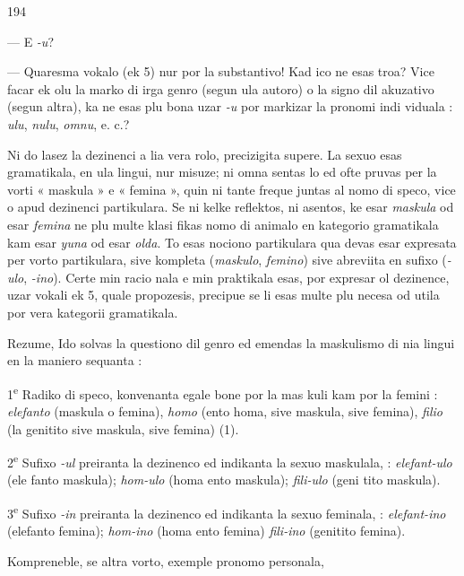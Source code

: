 \begin{VUpage}[198]{194}

--- E \textit{-u}?

--- Quaresma vokalo (ek 5) nur por la substantivo! Kad\nl
ico ne esas troa? Vice facar ek olu la marko di irga genro\nl
(segun ula autoro) o la signo dil akuzativo (segun altra),\nl
ka ne esas plu bona uzar \textit{-u} por markizar la pronomi indi\cc
viduala : \textit{ulu}, \textit{nulu}, \textit{omnu}, e. c.?

Ni do lasez la dezinenci a lia vera rolo, precizigita supere.\nl
La sexuo esas gramatikala, en ula lingui, nur misuze; ni\nl
omna sentas lo ed ofte pruvas per la vorti « maskula » e\nl
« femina », quin ni tante freque juntas al nomo di speco,\nl
vice o apud dezinenci partikulara. Se ni kelke reflektos, ni\nl
asentos, ke esar \textit{maskula} od esar \textit{femina} ne plu multe klasi\cc
fikas nomo di animalo en kategorio gramatikala kam esar\nl
\textit{yuna} od esar \textit{olda}. To esas nociono partikulara qua devas esar\nl
expresata per vorto partikulara, sive kompleta (\textit{maskulo},\nl
\textit{femino}) sive abreviita en sufixo (\textit{-ulo}, \textit{-ino}). Certe min racio\cc
nala e min praktikala esas, por expresar ol dezinence, uzar vokali ek 5, quale propozesis, precipue se li esas multe plu\nl
necesa od utila por vera kategorii gramatikala.

Rezume, Ido solvas la questiono dil genro ed emendas la\nl
maskulismo di nia lingui en la maniero sequanta :

1\textsuperscript{e} Radiko di speco, konvenanta egale bone por la mas\cc
kuli kam por la femini : \textit{elefanto} (maskula o femina), \textit{homo}\nl
(ento homa, sive maskula, sive femina), \textit{filio} (la genitito sive\nl
maskula, sive femina) (1).

2\textsuperscript{e} Sufixo \textit{-ul} preiranta la dezinenco ed indikanta la\nl
sexuo maskulala,  : \textit{elefant-ulo} (ele\cc
fanto maskula); \textit{hom-ulo} (homa ento maskula); \textit{fili-ulo} (geni\cc
tito maskula).

3\textsuperscript{e} Sufixo \textit{-in} preiranta la dezinenco ed indikanta la sexuo\nl
feminala,  : \textit{elefant-ino} (elefanto\nl
femina); \textit{hom-ino} (homa ento femina)\VUcorrige{,}{;} \textit{fili-ino} (genitito\nl
femina).

Kompreneble, se altra vorto, exemple pronomo personala,\parplein
\end{VUpage}

